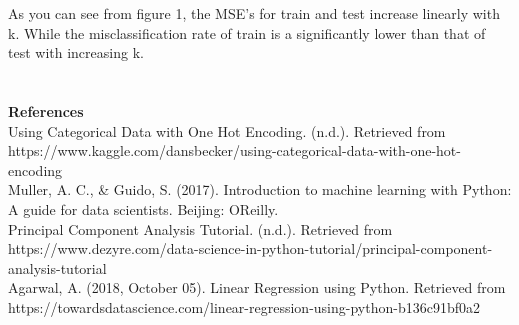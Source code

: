 \documentclass[a4paper]{article}
\begin{document}
As you can see from figure 1, the MSE's for train and test increase linearly with k. While the misclassification rate of train is a significantly lower than that of test with increasing k. \\ \\
\\

\textbf{{\Large References}} \\

Using Categorical Data with One Hot Encoding. (n.d.). Retrieved from \\ https://www.kaggle.com/dansbecker/using-categorical-data-with-one-hot-encoding \\

Muller, A. C., \& Guido, S. (2017). Introduction to machine learning with Python: A guide for data scientists. Beijing: OReilly. \\

Principal Component Analysis Tutorial. (n.d.). Retrieved from https://www.dezyre.com/data-science-in-python-tutorial/principal-component-analysis-tutorial \\

Agarwal, A. (2018, October 05). Linear Regression using Python. Retrieved from \\ https://towardsdatascience.com/linear-regression-using-python-b136c91bf0a2 \\
\end{document}
